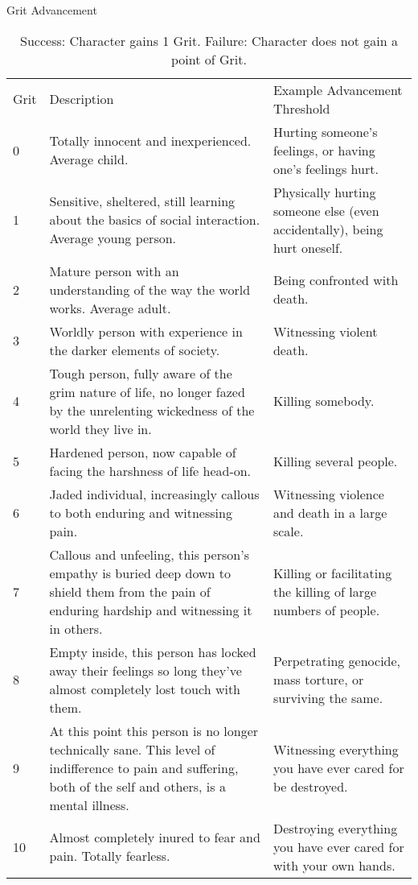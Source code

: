 \documentclass[oneside,11pt,english]{book}
\begin{document}
\begin{table}
	\caption{Grit Advancement}
	\label{tab:GritAdvancement}
\begin{tabu} spread 0pt {lXX}
Grit&Description&Example Advancement Threshold\\
0&Totally innocent and inexperienced. Average child.&Hurting someone’s feelings, or having one’s feelings hurt. \\
1&Sensitive, sheltered, still learning about the basics of social interaction. Average young person. & Physically hurting someone else (even accidentally), being hurt oneself. \\
2& Mature person with an understanding of the way the world works. Average adult. &Being confronted with death. \\
3&Worldly person with experience in the darker elements of society.& Witnessing violent death.\\
4&Tough person, fully aware of the grim nature of life, no longer fazed by the unrelenting wickedness of the world they live in. &Killing somebody. \\
5& Hardened person, now capable of facing the harshness of life head-on.&Killing several people. \\
6& Jaded individual, increasingly callous to both enduring and witnessing pain. &Witnessing violence and death in a large scale. \\
7& Callous and unfeeling, this person’s empathy is buried deep down to shield them from the pain of enduring hardship and witnessing it in others. &Killing or facilitating the killing of large numbers of people. \\
8& Empty inside, this person has locked away their feelings so long they’ve almost completely lost touch with them. &Perpetrating genocide, mass torture, or surviving the same.\\
9&At this point this person is no longer technically sane. This level of indifference to pain and suffering, both of the self and others, is a mental illness. &Witnessing everything you have ever cared for be destroyed. \\
10& Almost completely inured to fear and pain. Totally fearless. &Destroying everything you have ever cared for with your own hands. \\
\end{tabu}
\vspace{0.5 cm}
		\caption*{Success: Character gains 1 Grit. Failure: Character does not gain a point of Grit.}
\end{table} 
\end{document}
